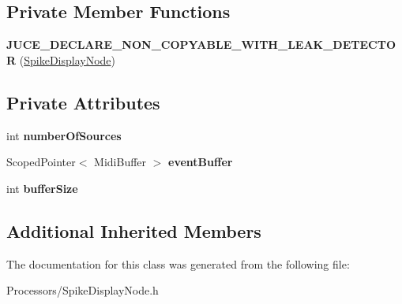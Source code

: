 \subsection*{Private Member Functions}
\begin{DoxyCompactItemize}
\item 
\hypertarget{classSpikeDisplayNode_a3777bdf9658cff6e3afa614c4dac42e0}{{\bfseries J\-U\-C\-E\-\_\-\-D\-E\-C\-L\-A\-R\-E\-\_\-\-N\-O\-N\-\_\-\-C\-O\-P\-Y\-A\-B\-L\-E\-\_\-\-W\-I\-T\-H\-\_\-\-L\-E\-A\-K\-\_\-\-D\-E\-T\-E\-C\-T\-O\-R} (\hyperlink{classSpikeDisplayNode}{Spike\-Display\-Node})}\label{classSpikeDisplayNode_a3777bdf9658cff6e3afa614c4dac42e0}

\end{DoxyCompactItemize}
\subsection*{Private Attributes}
\begin{DoxyCompactItemize}
\item 
\hypertarget{classSpikeDisplayNode_a7ddbfc9ca3815b4315bb69b72c3fa177}{int {\bfseries number\-Of\-Sources}}\label{classSpikeDisplayNode_a7ddbfc9ca3815b4315bb69b72c3fa177}

\item 
\hypertarget{classSpikeDisplayNode_aa5890dded2c29e97d9ba24281d9abc76}{Scoped\-Pointer$<$ Midi\-Buffer $>$ {\bfseries event\-Buffer}}\label{classSpikeDisplayNode_aa5890dded2c29e97d9ba24281d9abc76}

\item 
\hypertarget{classSpikeDisplayNode_a80df931484f4fa03a1a1a1a8863e3638}{int {\bfseries buffer\-Size}}\label{classSpikeDisplayNode_a80df931484f4fa03a1a1a1a8863e3638}

\end{DoxyCompactItemize}
\subsection*{Additional Inherited Members}


The documentation for this class was generated from the following file\-:\begin{DoxyCompactItemize}
\item 
Processors/Spike\-Display\-Node.\-h\end{DoxyCompactItemize}
